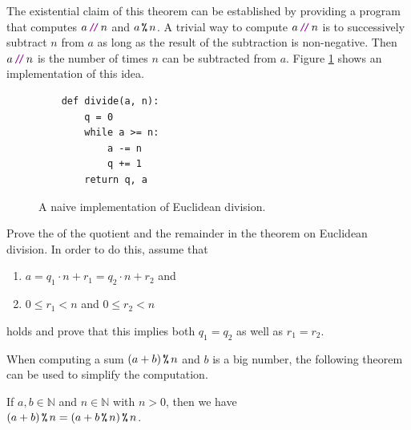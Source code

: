 The existential claim of this theorem can be established by providing a program that computes $a \dv n$ and $a \,\texttt{\%}\, n$.  
A trivial way to compute $a \dv n$ is to successively subtract
$n$ from $a$ as long as the result of the subtraction is non-negative.  Then $a \dv n$ is the number of times $n$ can be
subtracted from $a$.  Figure \ref{fig:Division-Naive.ipynb} shows an implementation of this idea.

\begin{figure}[!ht]
\centering
\begin{verbatim}
    def divide(a, n):
        q = 0
        while a >= n:
            a -= n
            q += 1
        return q, a
\end{verbatim}
\vspace*{-0.3cm}
\caption{A naive implementation of Euclidean division.}
\label{fig:Division-Naive.ipynb}
\end{figure}
\exercise
Prove the  of the quotient and the remainder in the theorem on Euclidean division.
In order to do this, assume that
\begin{enumerate}
\item $a = q_1 \cdot n + r_1 = q_2 \cdot n + r_2$ and
\item $0 \leq r_1 < n$ and $0 \leq r_2 < n$
\end{enumerate}
holds and prove that this implies both $q_1 = q_2$ as well as $r_1 = r_2$.  \eox

When computing a sum $(a + b) \,\texttt{\%}\, n$ and $b$ is a big number, the following theorem can be used to simplify
the computation.

\begin{Theorem}
  If $a, b \in \mathbb{N}$ and $n \in \mathbb{N}$ with $n > 0$, then we have
  \\[0.2cm]
  \hspace*{1.3cm}
  $\displaystyle (a + b) \,\texttt{\%}\, n = (a + b \,\texttt{\%}\, n) \,\texttt{\%}\, n$.
\end{Theorem}

